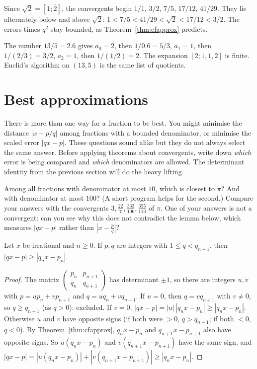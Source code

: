 \begin{examplex}
Since $\sqrt 2=[1;\overline{2}]$, the convergents begin $1/1$, $3/2$, $7/5$, $17/12$, $41/29$. They lie alternately below and above $\sqrt 2$: $1<7/5<41/29<\sqrt 2<17/12<3/2$. The errors times $q^2$ stay bounded, as Theorem~\ref{thm:cfapprox} predicts.
\end{examplex}

\begin{examplex}
The number $13/5=2.6$ gives $a_0=2$, then $1/0.6=5/3$, $a_1=1$, then $1/(2/3)=3/2$, $a_2=1$, then $1/(1/2)=2$. The expansion $[2;1,1,2]$ is finite. Euclid's algorithm on $(13,5)$ is the same list of quotients.
\end{examplex}

\section{Best approximations}

There is more than one way for a fraction to be best. You might minimise the distance $|x-p/q|$ among fractions with a bounded denominator, or minimise the scaled error $|qx-p|$. These questions sound alike but they do not always select the same answer. Before applying theorems about convergents, write down \emph{which} error is being compared and \emph{which} denominators are allowed. The determinant identity from the previous section will do the heavy lifting.

\begin{think}
Among all fractions with denominator at most $10$, which is closest to $\pi$? And with denominator at most $100$? (A short program helps for the second.) Compare your answers with the convergents $3,\frac{22}7,\frac{333}{106},\frac{355}{113}$ of $\pi$. One of your answers is not a convergent: can you see why this does not contradict the lemma below, which measures $|qx-p|$ rather than $\left|x-\frac pq\right|$?
\end{think}

\begin{lemma}\label{lem:best}
Let $x$ be irrational and $n\ge0$. If $p,q$ are integers with $1\le q<q_{n+1}$, then $|qx-p|\ge|q_nx-p_n|$.
\end{lemma}
\begin{proof}
The matrix $\begin{pmatrix}p_n&p_{n+1}\\q_n&q_{n+1}\end{pmatrix}$ has determinant $\pm1$, so there are integers $u,v$ with $p=up_n+vp_{n+1}$ and $q=uq_n+vq_{n+1}$. If $u=0$, then $q=vq_{n+1}$ with $v\ne0$, so $q\ge q_{n+1}$ (as $q>0$): excluded. If $v=0$, $|qx-p|=|u|\,|q_nx-p_n|\ge|q_nx-p_n|$. Otherwise $u$ and $v$ have opposite signs (if both were $>0$, $q>q_{n+1}$; if both $<0$, $q<0$). By Theorem~\ref{thm:cfapprox}, $q_nx-p_n$ and $q_{n+1}x-p_{n+1}$ also have opposite signs. So $u(q_nx-p_n)$ and $v(q_{n+1}x-p_{n+1})$ have the same sign, and
$|qx-p|=|u(q_nx-p_n)|+|v(q_{n+1}x-p_{n+1})|\ge|q_nx-p_n|$.
\end{proof}

